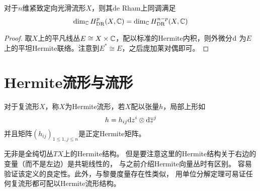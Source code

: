 \begin{cor}
对于$n$维紧致定向光滑流形$X$，则其de Rham上同调满足
$$
  \dim_{\mathbb{C}}H^p_{\operatorname{DR}}(X,\mathbb{C})
= \dim_{\mathbb{C}}H^{n-p}_{\operatorname{DR}}(X,\mathbb{C})
$$
\end{cor}

\begin{proof}
取$X$上的平凡线丛$E\cong X\times\mathbb{C}$，配以标准的Hermite内积，则外微分$\mathrm{d}$
为$E$上的平坦Hermite联络。注意到$E^*\cong E$，之后庞加莱对偶即可。
\end{proof}


\section{Hermite流形与\Kahler 流形}

\begin{definition}
对于复流形$X$，称$X$为Hermite流形，若$X$配以张量$h$，局部上形如
$$h=h_{ij}\mathrm{d} z^i\otimes\mathrm{d}\overline{z}^j$$
并且矩阵$(h_{ij})_{1\leq 1,j\leq n}$是正定Hermite矩阵。
\end{definition}

无非是全纯切丛$TX$上的Hermite结构。
但是要注意这里的Hermite结构关于右边的变量（而不是左边）是共轭线性的，
与之前介绍Hermite向量丛时有区别。
容易验证该定义的良定性。此外，与黎曼度量存在性类似，
用单位分解定理可易证任何复流形都可配以Hermite流形结构。


